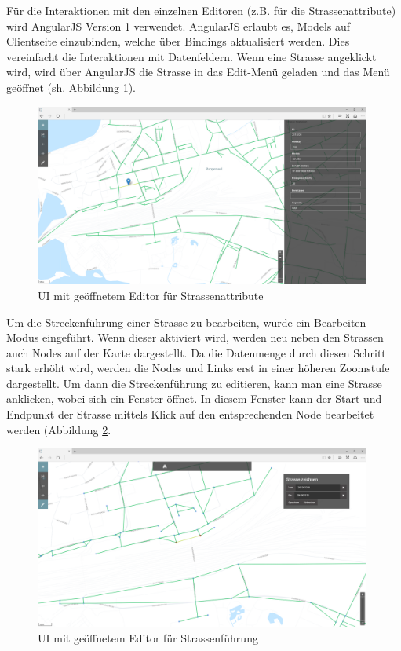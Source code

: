 \noindent
Für die Interaktionen mit den einzelnen Editoren (z.B. für die Strassenattribute) wird AngularJS\cite{AngularJS} Version 1 verwendet. AngularJS erlaubt es, Models auf Clientseite einzubinden, welche über Bindings aktualisiert werden. Dies vereinfacht die Interaktionen mit Datenfeldern. Wenn eine Strasse angeklickt wird, wird über AngularJS die Strasse in das Edit-Menü geladen und das Menü geöffnet (sh. Abbildung \ref{fig:editstreetattributes}).
\begin{figure}[H]
\centering
\includegraphics[height=6cm]{images/EditStreetattributes.PNG}
\caption{UI mit geöffnetem Editor für Strassenattribute}
\label{fig:editstreetattributes}
\end{figure}
\noindent
Um die Streckenführung einer Strasse zu bearbeiten, wurde ein Bearbeiten-Modus eingeführt. Wenn dieser aktiviert wird, werden neu neben den Strassen auch Nodes auf der Karte dargestellt. Da die Datenmenge durch diesen Schritt stark erhöht wird, werden die Nodes und Links erst in einer höheren Zoomstufe dargestellt. Um dann die Streckenführung zu editieren, kann man eine Strasse anklicken, wobei sich ein Fenster öffnet. In diesem Fenster kann der Start und Endpunkt der Strasse mittels Klick auf den entsprechenden Node bearbeitet werden (Abbildung \ref{fig:editstreetdirection}.
\begin{figure}[H]
\centering
\includegraphics[height=6cm]{images/EditStreetdirection.PNG}
\caption{UI mit geöffnetem Editor für Strassenführung}
\label{fig:editstreetdirection}
\end{figure}

